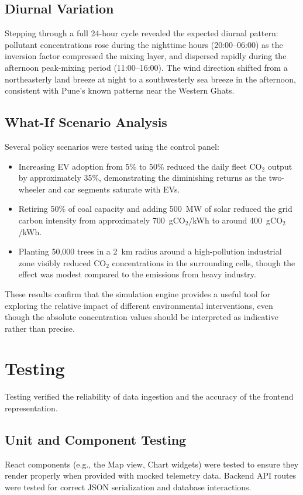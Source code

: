 \documentclass[a4paper, 12pt]{report}
\begin{document}
\subsection{Diurnal Variation}
Stepping through a full 24-hour cycle revealed the expected diurnal pattern: pollutant concentrations rose during the nighttime hours (20:00--06:00) as the inversion factor compressed the mixing layer, and dispersed rapidly during the afternoon peak-mixing period (11:00--16:00). The wind direction shifted from a northeasterly land breeze at night to a southwesterly sea breeze in the afternoon, consistent with Pune's known patterns near the Western Ghats.

\subsection{What-If Scenario Analysis}
Several policy scenarios were tested using the control panel:
\begin{itemize}
\item Increasing EV adoption from 5\% to 50\% reduced the daily fleet CO$_2$ output by approximately 35\%, demonstrating the diminishing returns as the two-wheeler and car segments saturate with EVs.
\item Retiring 50\% of coal capacity and adding 500~MW of solar reduced the grid carbon intensity from approximately 700~gCO$_2$/kWh to around 400~gCO$_2$/kWh.
\item Planting 50,000 trees in a 2~km radius around a high-pollution industrial zone visibly reduced CO$_2$ concentrations in the surrounding cells, though the effect was modest compared to the emissions from heavy industry.
\end{itemize}

These results confirm that the simulation engine provides a useful tool for exploring the relative impact of different environmental interventions, even though the absolute concentration values should be interpreted as indicative rather than precise.
\section{Testing}
Testing verified the reliability of data ingestion and the accuracy of the frontend representation.
\subsection{Unit and Component Testing}
React components (e.g., the Map view, Chart widgets) were tested to ensure they render properly when provided with mocked telemetry data. Backend API routes were tested for correct JSON serialization and database interactions.
\end{document}
